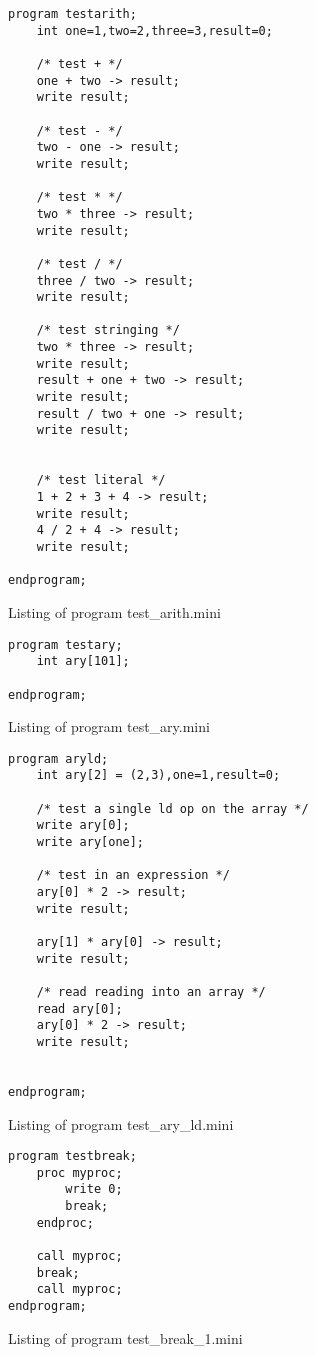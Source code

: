\documentclass[english]{article}
\begin{document}
\begin{program}
\begin{verbatim}
program testarith;
	int one=1,two=2,three=3,result=0;

	/* test + */
	one + two -> result;
	write result;

	/* test - */
	two - one -> result;
	write result;

	/* test * */
	two * three -> result;
	write result;

	/* test / */
	three / two -> result;
	write result;

	/* test stringing */
	two * three -> result;
	write result;
	result + one + two -> result;
	write result;
	result / two + one -> result;
	write result;


	/* test literal */
	1 + 2 + 3 + 4 -> result;
	write result;
	4 / 2 + 4 -> result;
	write result;

endprogram;\end{verbatim}
\caption{Listing of program test\_arith.mini}
\end{program}

\begin{program}
\begin{verbatim}
program testary;
	int ary[101];

endprogram;
\end{verbatim}
\caption{Listing of program test\_ary.mini}
\end{program}

\begin{program}
\begin{verbatim}
program aryld;
	int ary[2] = (2,3),one=1,result=0;

	/* test a single ld op on the array */
	write ary[0];
	write ary[one];

	/* test in an expression */
	ary[0] * 2 -> result;
	write result;

	ary[1] * ary[0] -> result;
	write result;

	/* read reading into an array */
	read ary[0];
	ary[0] * 2 -> result;
	write result;


endprogram;\end{verbatim}
\caption{Listing of program test\_ary\_ld.mini}
\end{program}

\begin{program}
\begin{verbatim}
program testbreak;
	proc myproc;
		write 0;
		break;
	endproc;

	call myproc;
	break;
	call myproc;
endprogram;\end{verbatim}
\caption{Listing of program test\_break\_1.mini}
\end{program}
\end{document}
